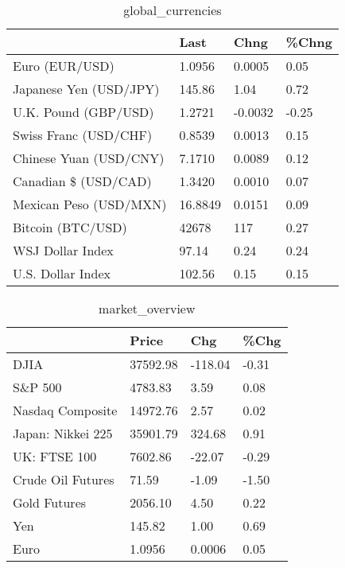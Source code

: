 \documentclass{article}%
\begin{document}
%


\begin{table}[htbp]%
\caption{global\_currencies}%
\centering%
\begin{adjustbox}{width=1\textwidth}%
\begin{tabular}{llll}
\toprule
                       &    Last &    Chng & \%Chng \\
\midrule
        Euro (EUR/USD) &  1.0956 &  0.0005 &  0.05 \\
Japanese Yen (USD/JPY) &  145.86 &    1.04 &  0.72 \\
  U.K. Pound (GBP/USD) &  1.2721 & -0.0032 & -0.25 \\
 Swiss Franc (USD/CHF) &  0.8539 &  0.0013 &  0.15 \\
Chinese Yuan (USD/CNY) &  7.1710 &  0.0089 &  0.12 \\
  Canadian \$ (USD/CAD) &  1.3420 &  0.0010 &  0.07 \\
Mexican Peso (USD/MXN) & 16.8849 &  0.0151 &  0.09 \\
     Bitcoin (BTC/USD) &   42678 &     117 &  0.27 \\
      WSJ Dollar Index &   97.14 &    0.24 &  0.24 \\
     U.S. Dollar Index &  102.56 &    0.15 &  0.15 \\
\bottomrule
\end{tabular}
%
\end{adjustbox}%
\end{table}

%


\begin{table}[htbp]%
\caption{market\_overview}%
\centering%
\begin{adjustbox}{width=1\textwidth}%
\begin{tabular}{llll}
\toprule
                  &    Price &     Chg &  \%Chg \\
\midrule
             DJIA & 37592.98 & -118.04 & -0.31 \\
          S\&P 500 &  4783.83 &    3.59 &  0.08 \\
 Nasdaq Composite & 14972.76 &    2.57 &  0.02 \\
Japan: Nikkei 225 & 35901.79 &  324.68 &  0.91 \\
     UK: FTSE 100 &  7602.86 &  -22.07 & -0.29 \\
Crude Oil Futures &    71.59 &   -1.09 & -1.50 \\
     Gold Futures &  2056.10 &    4.50 &  0.22 \\
              Yen &   145.82 &    1.00 &  0.69 \\
             Euro &   1.0956 &  0.0006 &  0.05 \\
\bottomrule
\end{tabular}
%
\end{adjustbox}%
\end{table}

%
\end{document}
